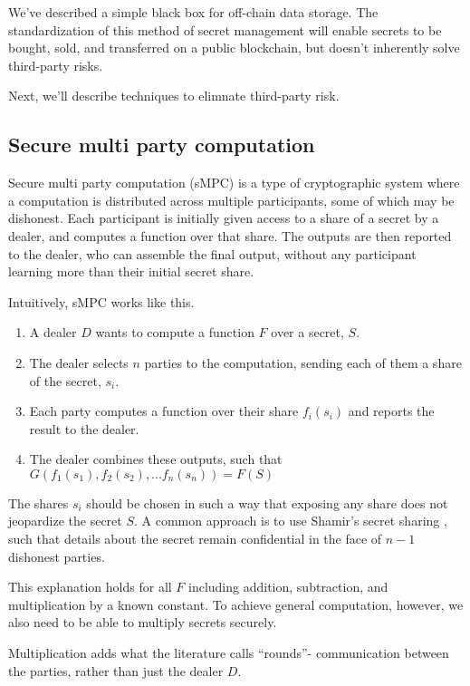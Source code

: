 \documentclass[11pt]{article}
\begin{document}
We've described a simple black box for off-chain data storage. The
standardization of this method of secret management will enable
secrets to be bought, sold, and transferred on a public blockchain,
but doesn't inherently solve third-party risks.

Next, we'll describe techniques to elimnate third-party risk.

\subsection{Secure multi party computation} \label{sMPC}

Secure multi party computation (sMPC) is a type of cryptographic
system where a computation is distributed across multiple
participants, some of which may be dishonest. Each participant is
initially given access to a share of a secret by a dealer, and
computes a function over that share. The outputs are then reported to
the dealer, who can assemble the final output, without any participant
learning more than their initial secret share.

Intuitively, sMPC works like this.

\begin{enumerate}
  \item A dealer $D$ wants to compute a function $F$ over a secret,
      $S$.
  \item The dealer selects $n$ parties to the computation, sending
      each of them a share of the secret, $s_i$.
  \item Each party computes a function over their share $f_i(s_i)$ and
      reports the result to the dealer.
  \item The dealer combines these outputs, such that
      $G(f_1(s_1),f_2(s_2),...f_n(s_n)) = F(S)$
\end{enumerate}

The shares $s_i$ should be chosen in such a way that exposing any
share does not jeopardize the secret $S$. A common approach is to use
Shamir's secret sharing \cite{shamir}, such that details about the
secret remain confidential in the face of $n-1$ dishonest parties.

This explanation holds for all $F$ including addition, subtraction,
and multiplication by a known constant. To achieve general
computation, however, we also need to be able to multiply secrets
securely.

Multiplication adds what the literature calls ``rounds''- communication
between the parties, rather than just the dealer $D$.
\end{document}
